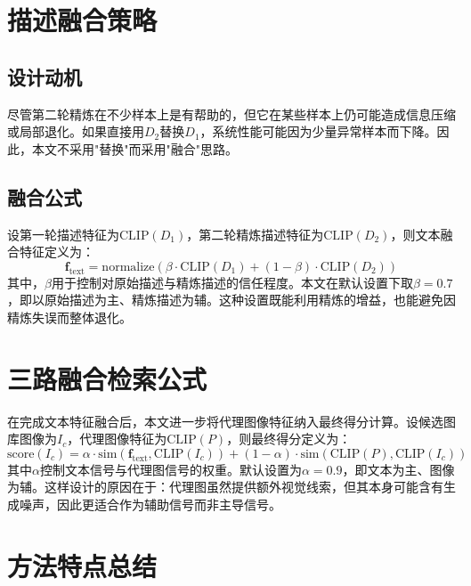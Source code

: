 \documentclass[12pt,a4paper,UTF8,oneside,openany]{ctexrep}
\begin{document}
\section{描述融合策略}

\subsection{设计动机}

尽管第二轮精炼在不少样本上是有帮助的，但它在某些样本上仍可能造成信息压缩或局部退化。如果直接用$D_2$替换$D_1$，系统性能可能因为少量异常样本而下降。因此，本文不采用"替换"而采用"融合"思路。

\subsection{融合公式}

设第一轮描述特征为$\mathrm{CLIP}(D_1)$，第二轮精炼描述特征为$\mathrm{CLIP}(D_2)$，则文本融合特征定义为：
\begin{equation}
  \mathbf{f}_{\text{text}} = \mathrm{normalize}\!\left(\beta \cdot \mathrm{CLIP}(D_1) + (1-\beta) \cdot \mathrm{CLIP}(D_2)\right)
  \label{eq:ensemble}
\end{equation}
其中，$\beta$用于控制对原始描述与精炼描述的信任程度。本文在默认设置下取$\beta=0.7$，即以原始描述为主、精炼描述为辅。这种设置既能利用精炼的增益，也能避免因精炼失误而整体退化。

\section{三路融合检索公式}

在完成文本特征融合后，本文进一步将代理图像特征纳入最终得分计算。设候选图库图像为$I_c$，代理图像特征为$\mathrm{CLIP}(P)$，则最终得分定义为：
\begin{equation}
  \mathrm{score}(I_c) = \alpha \cdot \mathrm{sim}\!\left(\mathbf{f}_{\text{text}}, \mathrm{CLIP}(I_c)\right) + (1-\alpha) \cdot \mathrm{sim}\!\left(\mathrm{CLIP}(P), \mathrm{CLIP}(I_c)\right)
  \label{eq:threeway}
\end{equation}
其中$\alpha$控制文本信号与代理图信号的权重。默认设置为$\alpha=0.9$，即文本为主、图像为辅。这样设计的原因在于：代理图虽然提供额外视觉线索，但其本身可能含有生成噪声，因此更适合作为辅助信号而非主导信号。

\section{方法特点总结}
\end{document}
